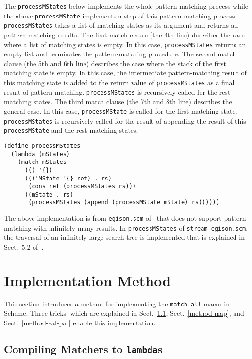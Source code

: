 \documentclass[acmlarge]{acmart}
\begin{document}
The \texttt{processMStates} below implements the whole pattern-matching process while the above \texttt{processMState} implements a step of this pattern-matching process.
\texttt{processMStates} takes a list of matching states as its argument and returns all pattern-matching results.
The first match clause (the 4th line) describes the case where a list of matching states is empty.
In this case, \texttt{processMStates} returns an empty list and terminates the pattern-matching procedure.
The second match clause (the 5th and 6th line) describes the case where the stack of the first matching state is empty.
In this case, the intermediate pattern-matching result of this matching state is added to the return value of \texttt{processMStates} as a final result of pattern matching.
\texttt{processMStates} is recursively called for the rest matching states.
The third match clause (the 7th and 8th line) describes the general case.
In this case, \texttt{processMState} is called for the first matching state.
\texttt{processMStates} is recursively called for the result of appending the result of this \texttt{processMState} and the rest matching states.

\begin{lstlisting}[language=egison]
(define processMStates
  (lambda (mStates)
    (match mStates
      (() '{})
      ((('MState '{} ret) . rs)
       (cons ret (processMStates rs)))
      ((mState . rs)
       (processMStates (append (processMState mState) rs))))))
\end{lstlisting}

The above implementation is from \texttt{egison.scm} of~\cite{egisonScheme} that does not support pattern matching with infinitely many results.
In \texttt{processMStates} of \texttt{stream-egison.scm}, the traversal of an infinitely large search tree is implemented that is explained in Sect.~5.2 of~\cite{egi2018aplas}.

\section{Implementation Method}\label{method}

This section introduces a method for implementing the \texttt{match-all} macro in Scheme.
Three tricks, which are explained in Sect.~\ref{method-matcher}, Sect.~\ref{method-map}, and Sect.~\ref{method-val-pat} enable this implementation.

\subsection{Compiling Matchers to \texttt{lambda}s}\label{method-matcher}
\end{document}
